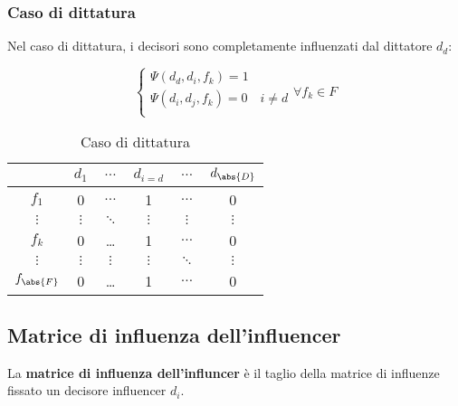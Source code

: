 \documentclass[\main/main.tex]{subfiles}
\begin{document}
\subsubsection{Caso di dittatura}
Nel caso di dittatura, i decisori sono completamente influenzati dal dittatore $d_d$:

\[
	\begin{cases}
		\Psi(d_d, d_i, f_k) = 1                \\
		\Psi(d_i, d_j, f_k) = 0 \quad i \neq d \\
	\end{cases}
	\forall f_k \in F
\]

\begin{table}
	\begin{tabular}{|c|c|c|c|c|c|}
		\hline
		              & $d_1$    & $\ldots$ & $d_{i=d}$ & $\ldots$ & $d_{\abs{D}}$ \\
		\hline
		$f_1$         & 0        & $\ldots$ & 1         & $\ldots$ & 0             \\
		\hline
		$\vdots$      & $\vdots$ & $\ddots$ & $\vdots$  & $\vdots$ & $\vdots$      \\
		\hline
		$f_k$         & 0        & \ldots   & 1         & $\ldots$ & 0             \\
		\hline
		$\vdots$      & $\vdots$ & $\vdots$ & $\vdots$  & $\ddots$ & $\vdots$      \\
		\hline
		$f_{\abs{F}}$ & 0        & \ldots   & 1         & $\ldots$ & 0             \\
		\hline
	\end{tabular}
	\caption{Caso di dittatura}
\end{table}


\subsection{Matrice di influenza dell'influencer}
La \textbf{matrice di influenza dell'influncer} è il taglio della matrice di influenze fissato un decisore influencer $d_i$.
\end{document}
